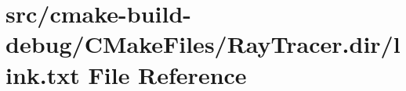 \hypertarget{cmake-build-debug_2CMakeFiles_2RayTracer_8dir_2link_8txt}{}\section{src/cmake-\/build-\/debug/\+C\+Make\+Files/\+Ray\+Tracer.dir/link.txt File Reference}
\label{cmake-build-debug_2CMakeFiles_2RayTracer_8dir_2link_8txt}
